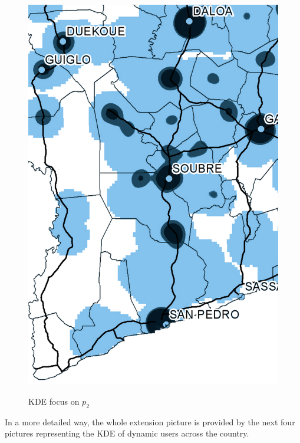 \begin{figure}[h!]
{    \includegraphics[scale = 0.1]{results/images/kernel/21_detail_p2.pdf}
	\label{fig:subfig2_detail}
}
\caption[KDE focus on $p_2$]{KDE focus on $p_2$}
\label{fig:subfigureExample}
\end{figure}


In a more detailed way, the whole extension picture is provided by the next four pictures representing the KDE of dynamic users across the country.

\newpage


